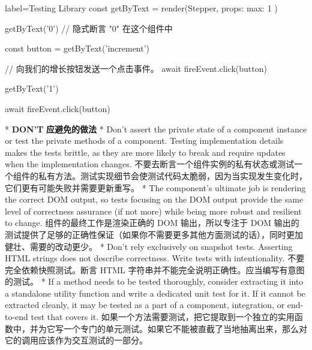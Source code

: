 \begin{codeJs*}{label={Testing Library}}
const { getByText } = render(Stepper, {
props: {
    max: 1
}
})

getByText('0') // 隐式断言 "0" 在这个组件中

const button = getByText('increment')

// 向我们的增长按钮发送一个点击事件。
await fireEvent.click(button)

getByText('1')

await fireEvent.click(button)
\end{codeJs*}    

\begin{paracol}{2}

\switchcolumn[0]*%
\textbf{DON'T}
\switchcolumn
\textbf{应避免的做法}
\switchcolumn[0]*%
Don't assert the private state of a component instance or test the
private methods of a component. Testing implementation details makes
the tests brittle, as they are more likely to break and require
updates when the implementation changes.
\switchcolumn
不要去断言一个组件实例的私有状态或测试一个组件的私有方法。测试实现细节会使测试代码太脆弱，因为当实现发生变化时，它们更有可能失败并需要更新重写。
\switchcolumn[0]*%
  The component's ultimate job is rendering the correct DOM output, so
  tests focusing on the DOM output provide the same level of correctness
  assurance (if not more) while being more robust and resilient to
  change.
\switchcolumn
  组件的最终工作是渲染正确的 DOM 输出，所以专注于 DOM
  输出的测试提供了足够的正确性保证（如果你不需要更多其他方面测试的话），同时更加健壮、需要的改动更少。
\switchcolumn[0]*%
  Don't rely exclusively on snapshot tests. Asserting HTML strings does
  not describe correctness. Write tests with intentionality.
\switchcolumn
  不要完全依赖快照测试。断言 HTML
  字符串并不能完全说明正确性。应当编写有意图的测试。
\switchcolumn[0]*%
  If a method needs to be tested thoroughly, consider extracting it into
  a standalone utility function and write a dedicated unit test for it.
  If it cannot be extracted cleanly, it may be tested as a part of a
  component, integration, or end-to-end test that covers it.
\switchcolumn
  如果一个方法需要测试，把它提取到一个独立的实用函数中，并为它写一个专门的单元测试。如果它不能被直截了当地抽离出来，那么对它的调用应该作为交互测试的一部分。
\end{paracol}


